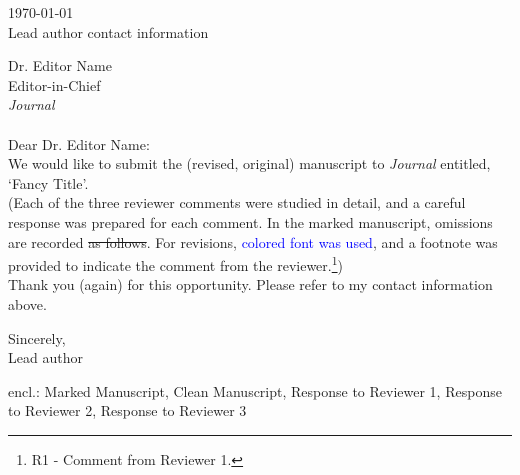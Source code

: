\documentclass[11pt,a4paper]{article}
\newcommand{\edit}[1]{\textcolor{blue}{#1}} %
\newcommand{\fn}[1]{\footnote{#1}} %
\begin{document}
\thispagestyle{empty} %

\begin{flushright}
    \today \\
    Lead author contact information
\end{flushright}

\noindent Dr. Editor Name \\
Editor-in-Chief \\
\textit{Journal} \\ \\

\noindent Dear Dr. Editor Name: \\

\noindent We would like to submit the (revised, original) manuscript to \textit{Journal} entitled, `Fancy Title'. \\

\noindent (Each of the three reviewer comments were studied in detail, and a careful response was prepared for each comment. In the marked manuscript, omissions are recorded \sout{as follows}. For revisions, \edit{colored font was used}, and a footnote was provided to indicate the comment from the reviewer.\fn{R1 - Comment from Reviewer 1.})\\

\noindent Thank you (again) for this opportunity. Please refer to my contact information above. 

\vspace*{\fill}
\begin{flushright}
    Sincerely,\\
    Lead author
\end{flushright}
\noindent \small{encl.: Marked Manuscript, Clean Manuscript, Response to Reviewer 1, Response to Reviewer 2, Response to Reviewer 3} %
\end{document}
